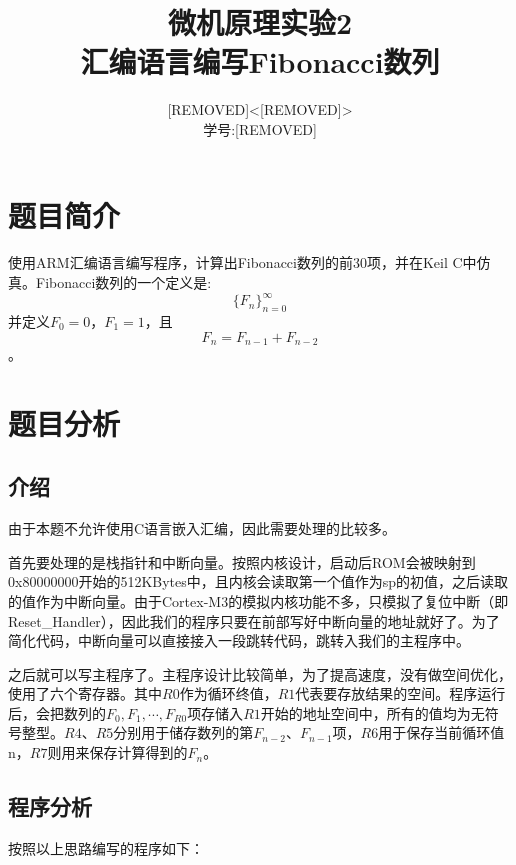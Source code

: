 \documentclass{ctexart}
\author{[REMOVED]<[REMOVED]>\\学号:[REMOVED]}
\title{微机原理实验2\\汇编语言编写Fibonacci数列}
\begin{document}
\begin{titlepage}
\maketitle
\thispagestyle{empty}
\newpage
\tableofcontents
\thispagestyle{empty}
\end{titlepage}

\setcounter{page}{1}

\section{题目简介} 

使用ARM汇编语言编写程序，计算出Fibonacci数列的前30项，并在Keil C中仿真。Fibonacci数列的一个定义是:
\[\{F_n\}_{n=0}^\infty\]
并定义\(F_{0}=0\)，\(F_{1}=1\)，且
\[F_{n}=F_{n-1}+F_{n-2}\]
。

\section{题目分析}

\subsection{介绍}
由于本题不允许使用C语言嵌入汇编，因此需要处理的比较多。

首先要处理的是栈指针和中断向量。按照内核设计，启动后ROM会被映射到0x80000000开始的512KBytes中，且内核会读取第一个值作为sp的初值，之后读取的值作为中断向量。由于Cortex-M3的模拟内核功能不多，只模拟了复位中断（即Reset\_Handler），因此我们的程序只要在前部写好中断向量的地址就好了。为了简化代码，中断向量可以直接接入一段跳转代码，跳转入我们的主程序中。

之后就可以写主程序了。主程序设计比较简单，为了提高速度，没有做空间优化，使用了六个寄存器。其中$R0$作为循环终值，$R1$代表要存放结果的空间。程序运行后，会把数列的\(F_{0},F_{1},\cdots,F_{R0}\)项存储入$R1$开始的地址空间中，所有的值均为无符号整型。$R4$、$R5$分别用于储存数列的第\(F_{n-2}\)、\(F_{n-1}\)项，$R6$用于保存当前循环值n，$R7$则用来保存计算得到的\(F_{n}\)。

\subsection{程序分析}

按照以上思路编写的程序如下：
\end{document}
